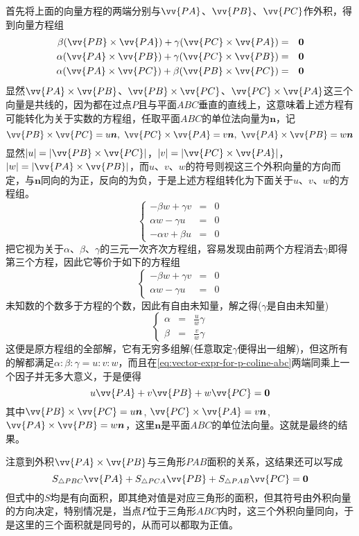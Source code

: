 \begin{example}
  首先将上面的向量方程的两端分别与$\vv{PA}$、$\vv{PB}$、$\vv{PC}$作外积，得到向量方程组
  \begin{eqnarray*}
    \beta (\vv{PB}\times\vv{PA}) + \gamma (\vv{PC}\times\vv{PA}) & = & \bm{0} \\
    \alpha (\vv{PA}\times\vv{PB}) + \gamma (\vv{PC}\times\vv{PB}) & = & \bm{0} \\
    \alpha (\vv{PA}\times\vv{PC}) + \beta (\vv{PB}\times\vv{PC}) & = & \bm{0}
  \end{eqnarray*}
  显然$\vv{PA}\times\vv{PB}$、$\vv{PB}\times\vv{PC}$、$\vv{PC}\times\vv{PA}$这三个向量是共线的，因为都在过点$P$且与平面$ABC$垂直的直线上，这意味着上述方程有可能转化为关于实数的方程组，任取平面$ABC$的单位法向量为$\bm{n}$，记
  \[ \vv{PB}\times\vv{PC}=u\bm{n}, \  \vv{PC}\times\vv{PA} = v\bm{n}, \  \vv{PA}\times\vv{PB}=w\bm{n} \]
  显然$|u|=|\vv{PB}\times\vv{PC}|$，$|v|=|\vv{PC}\times\vv{PA}|$，$|w|=|\vv{PA}\times\vv{PB}|$，而$u$、$v$、$w$的符号则视这三个外积向量的方向而定，与$\bm{n}$同向的为正，反向的为负，于是上述方程组转化为下面关于$u$、$v$、$w$的方程组。
  \[
    \left\{
  \begin{array}{lll}
    -\beta w + \gamma v & = & 0 \\
    \alpha w - \gamma u & = & 0 \\
    - \alpha v + \beta u & = & 0
  \end{array}
  \right.
  \]
  把它视为关于$\alpha$、$\beta$、$\gamma$的三元一次齐次方程组，容易发现由前两个方程消去$\gamma$即得第三个方程，因此它等价于如下的方程组
   \[
    \left\{
  \begin{array}{lll}
    -\beta w + \gamma v & = & 0 \\
    \alpha w - \gamma u & = & 0 
  \end{array}
  \right.
  \]
  未知数的个数多于方程的个数，因此有自由未知量，解之得($\gamma$是自由未知量)
   \[
    \left\{
  \begin{array}{lll}
    \alpha & = & \frac{u}{w} \gamma \\
    \beta & = & \frac{v}{w} \gamma
  \end{array}
  \right.
  \]
  这便是原方程组的全部解，它有无穷多组解(任意取定$\gamma$便得出一组解)，但这所有的解都满足$\alpha:\beta:\gamma=u:v:w$，而且在\autoref{eq:vector-expr-for-p-coline-abc}两端同乘上一个因子并无多大意义，于是便得
  \[ u \vv{PA} + v \vv{PB} + w \vv{PC} = \bm{0} \]
  其中$\vv{PB}\times\vv{PC}=u\bm{n}$, $\vv{PC}\times\vv{PA}=v\bm{n}$, $\vv{PA}\times\vv{PB}=w\bm{n}$，这里$\bm{n}$是平面$ABC$的单位法向量。这就是最终的结果。

  注意到外积$\vv{PA}\times\vv{PB}$与三角形$PAB$面积的关系，这结果还可以写成
  \[ S_{\triangle PBC} \vv{PA} + S_{\triangle PCA} \vv{PB} + S_{\triangle PAB} \vv{PC} = \bm{0} \]
  但式中的$S$均是有向面积，即其绝对值是对应三角形的面积，但其符号由外积向量的方向决定，特别情况是，当点$P$位于三角形$ABC$内时，这三个外积向量同向，于是这里的三个面积就是同号的，从而可以都取为正值。
\end{example}


